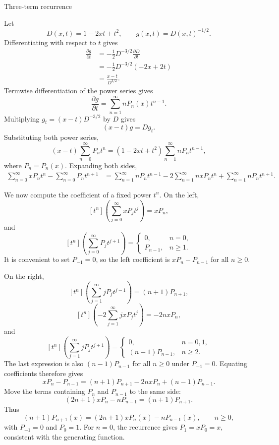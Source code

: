 \documentclass[11pt]{beamer}
\begin{document}
\begin{frame}[allowframebreaks]{Three-term recurrence}
\footnotesize

Let
\[
  D(x,t)=1-2xt+t^2,
  \qquad
  g(x,t)=D(x,t)^{-1/2}.
\]
Differentiating with respect to $t$ gives
\begin{align*}
  \frac{\partial g}{\partial t}
  &=-\frac12D^{-3/2}\frac{\partial D}{\partial t} \\
  &=-\frac12D^{-3/2}(-2x+2t) \\
  &=\frac{x-t}{D^{3/2}}.
\end{align*}
Termwise differentiation of the power series gives
\begin{equation}
  \frac{\partial g}{\partial t}
  =\sum_{n=1}^{\infty}nP_n(x)t^{n-1}.
  \label{eq:dgdt}
\end{equation}
Multiplying $g_t=(x-t)D^{-3/2}$ by $D$ gives
\[
  (x-t)g=Dg_t.
\]
Substituting both power series,
\[
  (x-t)\sum_{n=0}^{\infty}P_nt^n
  =(1-2xt+t^2)\sum_{n=1}^{\infty}nP_nt^{n-1},
\]
where $P_n=P_n(x)$. Expanding both sides,
\begin{align}
  \sum_{n=0}^{\infty}xP_nt^n
  -\sum_{n=0}^{\infty}P_nt^{n+1}
  &=\sum_{n=1}^{\infty}nP_nt^{n-1}
    -2\sum_{n=1}^{\infty}nxP_nt^n
    +\sum_{n=1}^{\infty}nP_nt^{n+1}.
  \label{eq:distribute}
\end{align}

We now compute the coefficient of a fixed power $t^n$.
On the left,
\[
  [t^n]\left(\sum_{j=0}^{\infty}xP_jt^j\right)=xP_n,
\]
and
\[
  [t^n]\left(\sum_{j=0}^{\infty}P_jt^{j+1}\right)
  =\begin{cases}
      0,&n=0,\\
      P_{n-1},&n\ge1.
    \end{cases}
\]
It is convenient to set $P_{-1}=0$, so the left coefficient is $xP_n-P_{n-1}$ for all
$n\ge0$.

On the right,
\[
  [t^n]\left(\sum_{j=1}^{\infty}jP_jt^{j-1}\right)
  =(n+1)P_{n+1},
\]
\[
  [t^n]\left(-2\sum_{j=1}^{\infty}jxP_jt^j\right)
  =-2nxP_n,
\]
and
\[
  [t^n]\left(\sum_{j=1}^{\infty}jP_jt^{j+1}\right)
  =\begin{cases}
     0,&n=0,1,\\
     (n-1)P_{n-1},&n\ge2.
   \end{cases}
\]
The last expression is also $(n-1)P_{n-1}$ for all $n\ge0$ under $P_{-1}=0$.
Equating coefficients therefore gives
\[
  xP_n-P_{n-1}
  =(n+1)P_{n+1}-2nxP_n+(n-1)P_{n-1}.
\]
Move the terms containing $P_n$ and $P_{n-1}$ to the same side:
\[
  (2n+1)xP_n-nP_{n-1}=(n+1)P_{n+1}.
\]
Thus
\begin{equation}
  (n+1)P_{n+1}(x)
  =(2n+1)xP_n(x)-nP_{n-1}(x),
  \qquad n\ge0,
  \label{eq:legendre-recur}
\end{equation}
with $P_{-1}=0$ and $P_0=1$. For $n=0$, the recurrence gives
$P_1=xP_0=x$, consistent with the generating function.
\end{frame}
\end{document}
